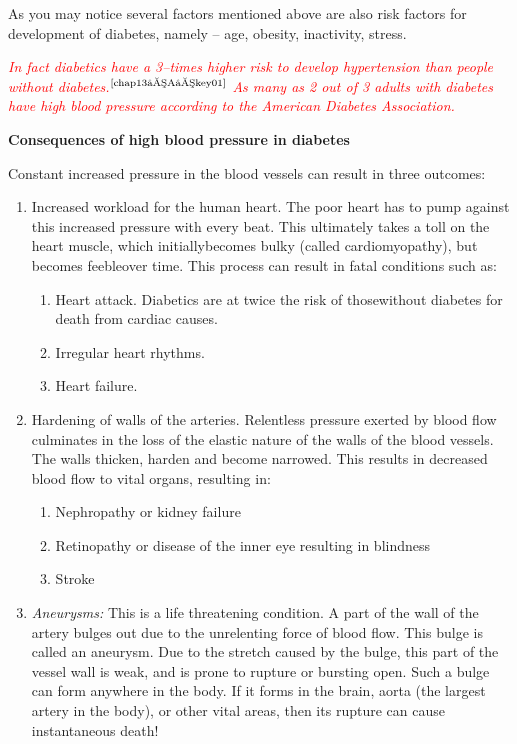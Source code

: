 As you may notice several factors mentioned above are also risk factors for development of diabetes, namely – age, obesity, inactivity, stress.

\textcolor{red}{\textit{In fact diabetics have a 3–times higher risk to develop hypertension than people without diabetes.}}$^{\text{\cite{chap13–A–key01}}}$ \textcolor{red}{\textit{As many as 2 out of 3 adults with diabetes have high blood pressure according to the American Diabetes Association.}}

\vskip 8pt
\noindent\textbf{Consequences of high blood pressure in diabetes}

Constant increased pressure in the blood vessels can result in three outcomes:

\begin{enumerate}
\itemsep=0pt
\item Increased workload for the human heart. The poor heart has to pump against this increased pressure with every beat. This ultimately takes a toll on the heart muscle, which initially\break becomes bulky (called cardiomyopathy), but becomes feeble\break over time. This process can result in fatal conditions such as:
\begin{enumerate}
\itemsep=0pt
 \item Heart attack. Diabetics are at twice the risk of those\break without diabetes for death from cardiac causes.
\item Irregular heart rhythms.
\item Heart failure.
\end{enumerate}
\item Hardening of walls of the arteries. Relentless pressure exerted by blood flow culminates in the loss of the elastic nature of the walls of the blood vessels. The walls thicken, harden and become narrowed. This results in decreased blood flow to vital organs, resulting in:
\begin{enumerate}
\itemsep=0pt
\item Nephropathy or kidney failure
\item Retinopathy or disease of the inner eye resulting in blindness
\item Stroke
\end{enumerate}
\item \textit{Aneurysms:} This is a life threatening condition. A part of the wall of the artery bulges out due to the unrelenting force of blood flow. This bulge is called an aneurysm. Due to the stretch caused by the bulge, this part of the vessel wall is weak, and is prone to rupture or bursting open. Such a bulge can form anywhere in the body. If it forms in the brain, aorta (the largest artery in the body), or other vital areas, then its rupture can cause instantaneous death!
\end{enumerate}

